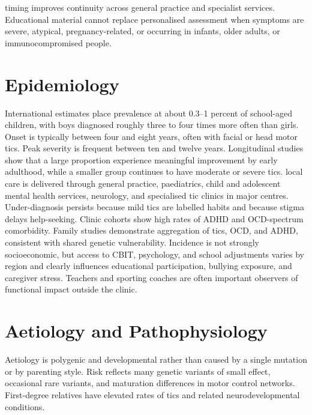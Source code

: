 timing improves continuity across general practice and specialist services. Educational material cannot replace personalised assessment when symptoms are severe, atypical, pregnancy-related, or occurring in infants, older adults, or immunocompromised people.

\section*{Epidemiology}
International estimates place prevalence at about 0.3--1 percent of school-aged children, with boys diagnosed roughly three to four times more often than girls. Onset is typically between four and eight years, often with facial or head motor tics. Peak severity is frequent between ten and twelve years. Longitudinal studies show that a large proportion experience meaningful improvement by early adulthood, while a smaller group continues to have moderate or severe tics. local care is delivered through general practice, paediatrics, child and adolescent mental health services, neurology, and specialised tic clinics in major centres. Under-diagnosis persists because mild tics are labelled habits and because stigma delays help-seeking. Clinic cohorts show high rates of ADHD and OCD-spectrum comorbidity. Family studies demonstrate aggregation of tics, OCD, and ADHD, consistent with shared genetic vulnerability. Incidence is not strongly socioeconomic, but access to CBIT, psychology, and school adjustments varies by region and clearly influences educational participation, bullying exposure, and caregiver stress. Teachers and sporting coaches are often important observers of functional impact outside the clinic.

\section*{Aetiology and Pathophysiology}
Aetiology is polygenic and developmental rather than caused by a single mutation or by parenting style. Risk reflects many genetic variants of small effect, occasional rare variants, and maturation differences in motor control networks. First-degree relatives have elevated rates of tics and related neurodevelopmental conditions.

